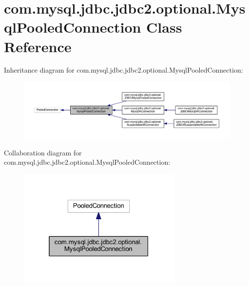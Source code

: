 \hypertarget{classcom_1_1mysql_1_1jdbc_1_1jdbc2_1_1optional_1_1_mysql_pooled_connection}{}\section{com.\+mysql.\+jdbc.\+jdbc2.\+optional.\+Mysql\+Pooled\+Connection Class Reference}
\label{classcom_1_1mysql_1_1jdbc_1_1jdbc2_1_1optional_1_1_mysql_pooled_connection}


Inheritance diagram for com.\+mysql.\+jdbc.\+jdbc2.\+optional.\+Mysql\+Pooled\+Connection\+:
\nopagebreak
\begin{figure}[H]
\begin{center}
\leavevmode
\includegraphics[width=350pt]{classcom_1_1mysql_1_1jdbc_1_1jdbc2_1_1optional_1_1_mysql_pooled_connection__inherit__graph}
\end{center}
\end{figure}


Collaboration diagram for com.\+mysql.\+jdbc.\+jdbc2.\+optional.\+Mysql\+Pooled\+Connection\+:
\nopagebreak
\begin{figure}[H]
\begin{center}
\leavevmode
\includegraphics[width=232pt]{classcom_1_1mysql_1_1jdbc_1_1jdbc2_1_1optional_1_1_mysql_pooled_connection__coll__graph}
\end{center}
\end{figure}

